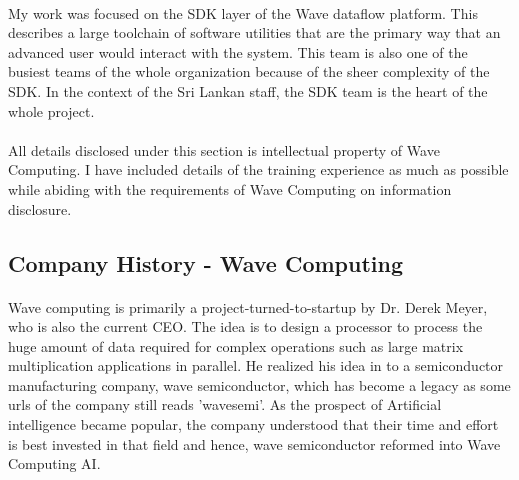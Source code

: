 \paragraph{}
My work was focused on the SDK layer of the Wave dataflow platform. This describes a large toolchain of software utilities that are the primary way that an advanced user would interact with the system. This team is also one of the busiest teams of the whole organization because of the sheer complexity of the SDK. In the context of the Sri Lankan staff, the SDK team is the heart of the whole project.

\paragraph{}
All details disclosed under this section is intellectual property of Wave Computing. I have included details of the training experience as much as possible while abiding with the requirements of Wave Computing on information disclosure.

\subsection{Company History - Wave Computing}

\paragraph{}
Wave computing is primarily a project-turned-to-startup by Dr. Derek Meyer, who is also the current CEO. The idea is to design a processor to process the huge amount of data required for complex operations such as large matrix multiplication applications in parallel. He realized his idea in to a semiconductor manufacturing company, wave semiconductor, which has become a legacy as some urls of the company still reads 'wavesemi'. As the prospect of Artificial intelligence became popular, the company understood that their time and effort is best invested in that field and hence, wave semiconductor reformed into Wave Computing AI.

